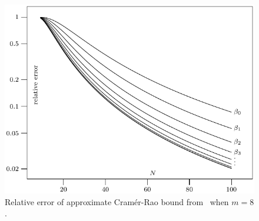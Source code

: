 \documentclass[review]{elsarticle}
\begin{document}
 \begin{figure}[p]
    	\centering 
   		\includegraphics{fig4.pdf} 
    		\caption{Relative error of approximate Cram\'{e}r-Rao bound from~\cite{Peleg1991_CRB_PPS_1991} when $m=8$.} 
    		\label{plot:relerror} 
 \end{figure}
\end{document}
